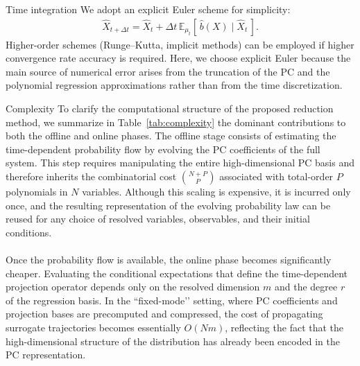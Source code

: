 \documentclass[11pt, a4paper, oneside, reqno]{amsart}
\makeatletter
\def\subsection{\@startsection{subsection}{2}%
	\z@{.5\linespacing\@plus.7\linespacing}{.5\linespacing}%
	{\normalfont\large\bfseries}}
\makeatother
\begin{document}
\subsection{Time integration}
\noindent We adopt an explicit Euler scheme for simplicity:
\begin{eqnarray}\label{eq:Reduced Dynamics Discretized}
\hat{X}_{t+\Delta t} = \hat{X}_t + \Delta t \, \mathbb{E}_{\mu_t}[\,\hat{b}(X)\mid \hat{X}_t\,].
\end{eqnarray}
Higher-order schemes (Runge–Kutta, implicit methods) can be employed if higher convergence rate accuracy is required. Here, we choose explicit Euler because the main source of numerical error arises from the truncation of the PC and the polynomial regression approximations rather than from the time discretization.  

\subsection{Complexity}
\noindent To clarify the computational structure of the proposed reduction method, we summarize in 
Table~\ref{tab:complexity} the dominant contributions to both the offline and online phases.  
The offline stage consists of estimating the time-dependent probability flow by evolving the 
PC coefficients of the full system. This step requires manipulating the 
entire high-dimensional PC basis and therefore inherits the combinatorial cost 
$\binom{N+P}{P}$ associated with total-order $P$ polynomials in $N$ variables. 
Although this scaling is expensive, it is incurred only once, and the resulting representation 
of the evolving probability law can be reused for any choice of resolved variables, observables, 
 and their initial conditions. \\ \ \\
Once the probability flow is available, the online phase becomes significantly cheaper. 
Evaluating the conditional expectations that define the time-dependent projection operator 
depends only on the resolved dimension $m$ and the degree $r$ of the regression basis.  
In the “fixed-mode’’ setting, where PC coefficients and projection bases are precomputed and 
compressed, the cost of propagating surrogate trajectories becomes essentially 
$O(N m)$, reflecting the fact that the high-dimensional structure of the distribution has 
already been encoded in the PC representation.  
\end{document}
